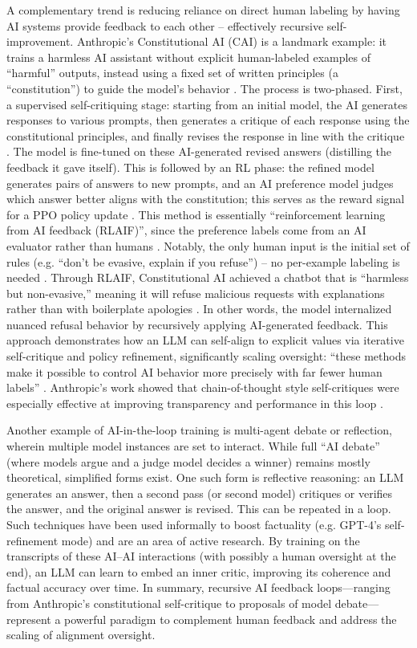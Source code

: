 \documentclass{article}
\begin{document}
A complementary trend is reducing reliance on direct human labeling by having AI systems provide feedback to each other – effectively recursive self-improvement. Anthropic’s Constitutional AI (CAI) is a landmark example: it trains a harmless AI assistant without explicit human-labeled examples of “harmful” outputs, instead using a fixed set of written principles (a “constitution”) to guide the model’s behavior  . The process is two-phased. First, a supervised self-critiquing stage: starting from an initial model, the AI generates responses to various prompts, then generates a critique of each response using the constitutional principles, and finally revises the response in line with the critique . The model is fine-tuned on these AI-generated revised answers (distilling the feedback it gave itself). This is followed by an RL phase: the refined model generates pairs of answers to new prompts, and an AI preference model judges which answer better aligns with the constitution; this serves as the reward signal for a PPO policy update . This method is essentially “reinforcement learning from AI feedback (RLAIF)”, since the preference labels come from an AI evaluator rather than humans . Notably, the only human input is the initial set of rules (e.g. “don’t be evasive, explain if you refuse”) – no per-example labeling is needed . Through RLAIF, Constitutional AI achieved a chatbot that is “harmless but non-evasive,” meaning it will refuse malicious requests with explanations rather than with boilerplate apologies . In other words, the model internalized nuanced refusal behavior by recursively applying AI-generated feedback. This approach demonstrates how an LLM can self-align to explicit values via iterative self-critique and policy refinement, significantly scaling oversight: “these methods make it possible to control AI behavior more precisely with far fewer human labels”  . Anthropic’s work showed that chain-of-thought style self-critiques were especially effective at improving transparency and performance in this loop .

Another example of AI-in-the-loop training is multi-agent debate or reflection, wherein multiple model instances are set to interact. While full “AI debate” (where models argue and a judge model decides a winner) remains mostly theoretical, simplified forms exist. One such form is reflective reasoning: an LLM generates an answer, then a second pass (or second model) critiques or verifies the answer, and the original answer is revised. This can be repeated in a loop. Such techniques have been used informally to boost factuality (e.g. GPT-4’s self-refinement mode) and are an area of active research. By training on the transcripts of these AI–AI interactions (with possibly a human oversight at the end), an LLM can learn to embed an inner critic, improving its coherence and factual accuracy over time. In summary, recursive AI feedback loops—ranging from Anthropic’s constitutional self-critique to proposals of model debate—represent a powerful paradigm to complement human feedback and address the scaling of alignment oversight.
\end{document}
